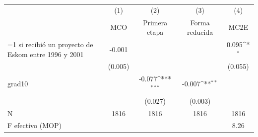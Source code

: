 {
\def\sym#1{\ifmmode^{#1}\else\(^{#1}\)\fi}
\begin{tabular}{l*{4}{c}}
\toprule
                    &\multicolumn{1}{c}{(1)}&\multicolumn{1}{c}{(2)}&\multicolumn{1}{c}{(3)}&\multicolumn{1}{c}{(4)}\\
                    &\multicolumn{1}{c}{MCO}&\multicolumn{1}{c}{Primera etapa}&\multicolumn{1}{c}{Forma reducida}&\multicolumn{1}{c}{MC2E}\\
\midrule
=1 si recibió un proyecto de Eskom entre 1996 y 2001&      -0.001         &                     &                     &       0.095\sym{*}  \\
                    &     (0.005)         &                     &                     &     (0.055)         \\
\addlinespace
grad10              &                     &      -0.077\sym{***}&      -0.007\sym{**} &                     \\
                    &                     &     (0.027)         &     (0.003)         &                     \\
\midrule
N                   &        1816         &        1816         &        1816         &        1816         \\
F efectivo (MOP)    &                     &                     &                     &        8.26         \\
\bottomrule
\end{tabular}
}
